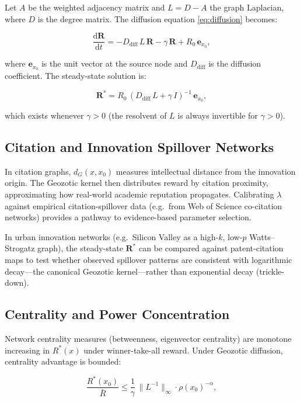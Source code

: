\documentclass[12pt,a4paper]{article}
\theoremstyle{definition}
\newcommand{\ddt}[1]{\frac{\mathrm{d}#1}{\mathrm{d}t}}
\begin{document}
Let $A$ be the weighted adjacency matrix and $L = D - A$ the graph Laplacian,
where $D$ is the degree matrix.  The diffusion equation \eqref{eq:diffusion}
becomes:

\begin{equation}
  \ddt{\mathbf{R}} = -D_{\mathrm{diff}}\,L\,\mathbf{R} - \gamma\,\mathbf{R}
  + R_0\,\mathbf{e}_{x_0},
\end{equation}

where $\mathbf{e}_{x_0}$ is the unit vector at the source node and
$D_{\mathrm{diff}}$ is the diffusion coefficient.  The steady-state solution is:

\begin{equation}
  \mathbf{R}^* = R_0\,(D_{\mathrm{diff}}\,L + \gamma\,I)^{-1}\,\mathbf{e}_{x_0},
\end{equation}

which exists whenever $\gamma > 0$ (the resolvent of $L$ is always invertible
for $\gamma > 0$).

\subsection*{Citation and Innovation Spillover Networks}

In citation graphs, $d_G(x, x_0)$ measures intellectual distance from the
innovation origin.  The Geozotic kernel then distributes reward by citation
proximity, approximating how real-world academic reputation propagates.
Calibrating $\lambda$ against empirical citation-spillover data (e.g.\
from Web of Science co-citation networks) provides a pathway to
evidence-based parameter selection.

In urban innovation networks (e.g.\ Silicon Valley as a high-$k$,
low-$p$ Watts--Strogatz graph), the steady-state $\mathbf{R}^*$ can be
compared against patent-citation maps to test whether observed spillover
patterns are consistent with logarithmic decay---the canonical Geozotic
kernel---rather than exponential decay (trickle-down).

\subsection*{Centrality and Power Concentration}

Network centrality measures (betweenness, eigenvector centrality) are
monotone increasing in $R^*(x)$ under winner-take-all reward.  Under
Geozotic diffusion, centrality advantage is bounded:

\begin{equation}
  \frac{R^*(x_0)}{\bar{R}} \leq
  \frac{1}{\gamma}\,\|L^{-1}\|_\infty \cdot \rho(x_0)^{-\alpha},
\end{equation}
\end{document}
